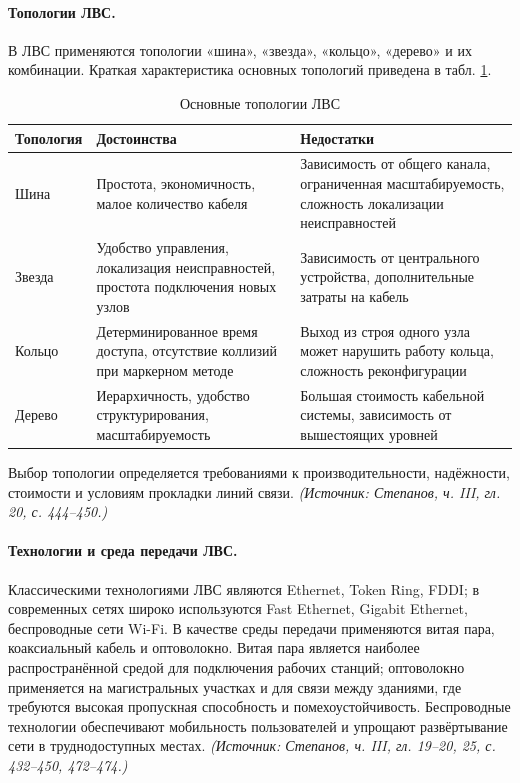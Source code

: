 \documentclass[a4paper,12pt]{article}
\begin{document}
\paragraph{Топологии ЛВС.}
В ЛВС применяются топологии «шина», «звезда», «кольцо», «дерево» и их комбинации. Краткая характеристика основных топологий приведена в табл. \ref{tab:lan-topologies}.

\begin{table}[h]
\centering
\caption{Основные топологии ЛВС}
\label{tab:lan-topologies}
\begin{tabular}{p{2.2cm}p{5.5cm}p{5.5cm}}
\toprule
\textbf{Топология} & \textbf{Достоинства} & \textbf{Недостатки} \\
\midrule
Шина & Простота, экономичность, малое количество кабеля & Зависимость от общего канала, ограниченная масштабируемость, сложность локализации неисправностей \\
Звезда & Удобство управления, локализация неисправностей, простота подключения новых узлов & Зависимость от центрального устройства, дополнительные затраты на кабель \\
Кольцо & Детерминированное время доступа, отсутствие коллизий при маркерном методе & Выход из строя одного узла может нарушить работу кольца, сложность реконфигурации \\
Дерево & Иерархичность, удобство структурирования, масштабируемость & Большая стоимость кабельной системы, зависимость от вышестоящих уровней \\
\bottomrule
\end{tabular}
\end{table}

Выбор топологии определяется требованиями к производительности, надёжности, стоимости и условиям прокладки линий связи.
\textit{(Источник: Степанов, ч. III, гл. 20, с. 444–450.)}

\paragraph{Технологии и среда передачи ЛВС.}
Классическими технологиями ЛВС являются Ethernet, Token Ring, FDDI; в современных сетях широко используются Fast Ethernet, Gigabit Ethernet, беспроводные сети Wi-Fi. В качестве среды передачи применяются витая пара, коаксиальный кабель и оптоволокно. Витая пара является наиболее распространённой средой для подключения рабочих станций; оптоволокно применяется на магистральных участках и для связи между зданиями, где требуются высокая пропускная способность и помехоустойчивость. Беспроводные технологии обеспечивают мобильность пользователей и упрощают развёртывание сети в труднодоступных местах.
\textit{(Источник: Степанов, ч. III, гл. 19–20, 25, с. 432–450, 472–474.)}
\end{document}
